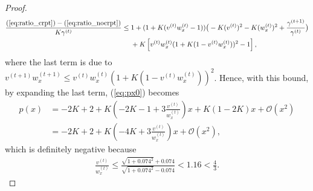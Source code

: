 \documentclass{article}
\theoremstyle{plain}
\theoremstyle{remark}
\def\t{^{(t)}}
\def\tt{^{(t+1)}}
\def\O{\mathcal{O}}
\begin{document}
\begin{proof}
\begin{align}
        \frac{(\ref{eq:ratio_crpt})-(\ref{eq:ratio_nocrpt})}{K\gamma\t}
        &\le 
        1+(1+K(v\t w_x\t-1))\big(
        -K(v\t)^2-K(w_x\t)^2+\frac{\gamma\tt}{\gamma\t}
        \big)
        \nonumber\\
        & ~~~~ + K\left[ v\t w_x\t(1+K(1-v\t w_x\t))^2-1\right],
\end{align}
where the last term is due to $v\tt w_x\tt \le v\t w_x\t(1+K(1-v\t w_x\t))^2$. Hence, with this bound, by expanding the last term, (\ref{eq:px0}) becomes
\begin{align}
    p(x) &= -2K + 2 + K\left(-2K-1+3\frac{v\t}{w_x\t}\right)x + K(1-2K)x + \O(x^2) \\
    &= -2K+2 + K\left(-4K+3\frac{v\t}{w_x\t}\right)x+\O(x^2),
\end{align}
which is definitely negative because 
\begin{align}
    \frac{v\t}{w_x\t}\le\frac{\sqrt{1+0.074^2}+0.074}{\sqrt{1+0.074^2}-0.074}<1.16<\frac{4}{3}.
\end{align}


\end{proof}
\end{document}
